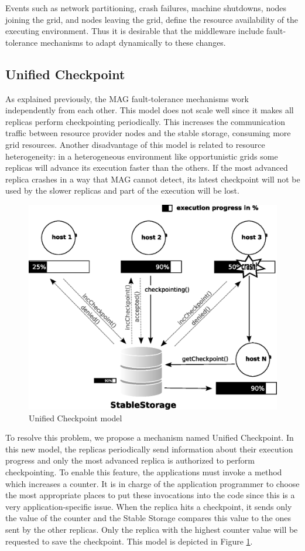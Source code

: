 \documentclass{cpeauth}
\begin{document}
Events such as network partitioning, crash failures, machine shutdowns,
nodes joining the grid, and nodes leaving the grid, define the resource
availability of the executing environment. Thus it is desirable that the middleware 
include fault-tolerance mechanisms to adapt dynamically to these changes.

\subsection{Unified Checkpoint}

As explained previously, the MAG fault-tolerance mechanisms work
independently from each other. This model does not scale well since it
makes all replicas perform checkpointing periodically. 
This increases the communication traffic between resource provider nodes and
the stable storage, consuming more grid resources. 
Another disadvantage of this model is related to resource
heterogeneity: in a heterogeneous environment like opportunistic grids some
replicas will advance its execution faster than the others. If the most
advanced replica crashes in a way that MAG cannot detect, its latest checkpoint
will not be used by the slower replicas and part of the execution will be
lost. 

\begin{figure}[th]
\centering \includegraphics[width=0.6\columnwidth]{images/repCheckNovoFalha.eps}
\caption{Unified Checkpoint model}
\label{fig:repCheckNovo}
\end{figure}

To resolve this problem, we propose a mechanism named Unified Checkpoint. In
this new model, the replicas periodically send information about their
execution progress and only the most advanced replica is authorized to perform
checkpointing. To enable this feature, the applications must invoke a method
which increases a counter. It is in charge of the application programmer to
choose the most appropriate places to put these invocations into the code
since this is a very application-specific issue. When the replica hits a
checkpoint, it sends only the value of the counter and the Stable Storage
compares this value to the ones sent by the other replicas. Only the
replica with the highest counter value will be requested to save the
checkpoint. This model is depicted in Figure \ref{fig:repCheckNovo}.
\end{document}
